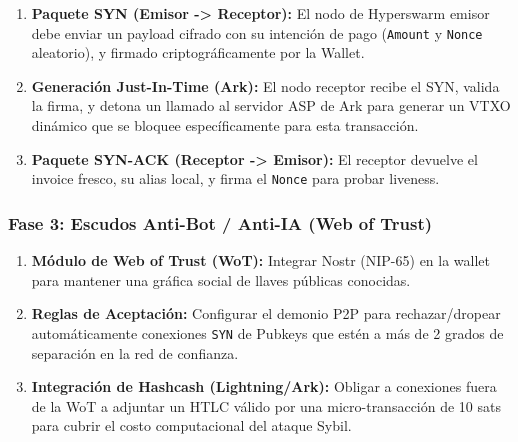 \documentclass[
]{article}
\providecommand{\tightlist}{%
  \setlength{\itemsep}{0pt}\setlength{\parskip}{0pt}}
\begin{document}
\begin{enumerate}
\def\labelenumi{\arabic{enumi}.}
\tightlist
\item[$\square$]
  \textbf{Paquete SYN (Emisor -\textgreater{} Receptor):} El nodo de
  Hyperswarm emisor debe enviar un payload cifrado con su intención de
  pago (\texttt{Amount} y \texttt{Nonce} aleatorio), y firmado
  criptográficamente por la Wallet.
\item[$\square$]
  \textbf{Generación Just-In-Time (Ark):} El nodo receptor recibe el
  SYN, valida la firma, y detona un llamado al servidor ASP de Ark para
  generar un VTXO dinámico que se bloquee específicamente para esta
  transacción.
\item[$\square$]
  \textbf{Paquete SYN-ACK (Receptor -\textgreater{} Emisor):} El
  receptor devuelve el invoice fresco, su alias local, y firma el
  \texttt{Nonce} para probar liveness.
\end{enumerate}

\hypertarget{fase-3-escudos-anti-bot-anti-ia-web-of-trust}{%
\subsubsection{Fase 3: Escudos Anti-Bot / Anti-IA (Web of
Trust)}\label{fase-3-escudos-anti-bot-anti-ia-web-of-trust}}

\begin{enumerate}
\def\labelenumi{\arabic{enumi}.}
\tightlist
\item[$\square$]
  \textbf{Módulo de Web of Trust (WoT):} Integrar Nostr (NIP-65) en la
  wallet para mantener una gráfica social de llaves públicas conocidas.
\item[$\square$]
  \textbf{Reglas de Aceptación:} Configurar el demonio P2P para
  rechazar/dropear automáticamente conexiones \texttt{SYN} de Pubkeys
  que estén a más de 2 grados de separación en la red de confianza.
\item[$\square$]
  \textbf{Integración de Hashcash (Lightning/Ark):} Obligar a conexiones
  fuera de la WoT a adjuntar un HTLC válido por una micro-transacción de
  10 sats para cubrir el costo computacional del ataque Sybil.
\end{enumerate}
\end{document}
